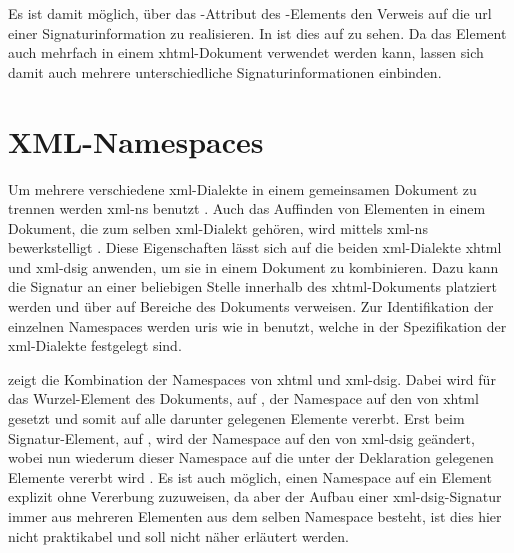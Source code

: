 Es ist damit möglich, über das -Attribut des -Elements den Verweis auf die \gls{url} einer Signaturinformation zu realisieren. In
 ist dies auf  zu sehen. Da das
Element auch mehrfach in einem \gls{xhtml}-Dokument verwendet werden kann, lassen sich damit auch mehrere unterschiedliche Signaturinformationen einbinden.



\section{XML-Namespaces}
\label{sec:Signaturbindung:XML-NS}
Um mehrere verschiedene \gls{xml}-Dialekte in einem gemeinsamen Dokument zu trennen werden \gls{xml-ns} benutzt \cite{xml-ns:w3c}. Auch das Auffinden von
Elementen in einem Dokument, die zum selben \gls{xml}-Dialekt gehören, wird mittels \gls{xml-ns} bewerkstelligt \cite{xml:oreilly}. Diese Eigenschaften lässt
sich auf die beiden \gls{xml}-Dialekte \gls{xhtml} und \gls{xml-dsig} anwenden, um sie in einem Dokument zu kombinieren. Dazu kann die Signatur an einer
beliebigen Stelle innerhalb des \gls{xhtml}-Dokuments platziert werden und über  auf Bereiche des Dokuments verweisen. Zur Identifikation der
einzelnen Namespaces werden \glspl{uri} wie in  benutzt, welche in der Spezifikation der \gls{xml}-Dialekte festgelegt sind.

 zeigt die Kombination der Namespaces von \gls{xhtml} und \gls{xml-dsig}. Dabei wird für das Wurzel-Element des Dokuments,  auf
, der Namespace auf den von \gls{xhtml} gesetzt und somit auf alle darunter gelegenen Elemente vererbt. Erst beim Signatur-Element,
 auf , wird der Namespace auf den von \gls{xml-dsig} geändert, wobei nun wiederum dieser Namespace auf die unter
der Deklaration gelegenen Elemente vererbt wird \cite{xml:oreilly}. Es ist auch möglich, einen Namespace auf ein Element explizit ohne Vererbung zuzuweisen, da
aber der Aufbau einer \gls{xml-dsig}-Signatur immer aus mehreren Elementen aus dem selben Namespace besteht, ist dies hier nicht praktikabel und soll nicht
näher erläutert werden.

